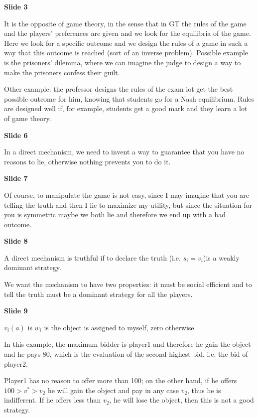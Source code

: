 \documentclass[pt11,a4paper,twoside,reqno,openright]{paper}
\begin{document}

\bigskip
\noindent \textbf{Slide 3}

\noindent It is the opposite of game theory, in the sense that in GT the rules 
of the game and the players' preferences are given and we look for the 
equilibria of the game. Here we look for a specific outcome and we design 
the rules of a game in such a way that this outcome is reached (sort of an 
inverse problem). Possible example is the prisoners' dilemma, where we can 
imagine the judge to design a way to make the prisoners confess their guilt. 

\noindent Other example: the professor designs the rules of the exam iot get 
the best possible outcome for him, knowing that students go for a Nash 
equilibrium. Rules are designed well if, for example, students get a good mark 
and they learn a lot of game theory.

\bigskip
\noindent \textbf{Slide 6}

\noindent In a direct mechanism, we need to invent a way to guarantee that you 
have no reasons to lie, otherwise nothing prevents you to do it.

\bigskip
\noindent \textbf{Slide 7}

\noindent Of course, to manipulate the game is not easy, since I may imagine 
that you are telling the truth and then I lie to maximize my utility, but 
since the situation for you is symmetric maybe we both lie and therefore we 
end up with a bad outcome.

\bigskip
\noindent \textbf{Slide 8}

\noindent A direct mechanism is truthful if to declare the truth (i.e. 
$s_i = v_i$)is a weakly dominant strategy.

\noindent We want the mechanism to have two properties: it must be social 
efficient and to tell the truth must be a dominant strategy for all the players.

\bigskip
\noindent \textbf{Slide 9}

\noindent $v_i(a)$ is $w_i$ is the object is assigned to myself, zero otherwise.

\noindent In this example, the maximum bidder is player1 and therefore he gain 
the object and he pays 80, which is the evaluation of the second highest bid, 
i.e. the bid of player2.

\noindent Player1 has no reason to offer more than 100; on the other hand, if he 
offers $100 > v^* > v_2$ he will gain the object and pay in any case $v_2$, thus 
he is indifferent. If he offers less than $v_2$, he will lose the object, then 
this is not a good strategy.
\end{document}
